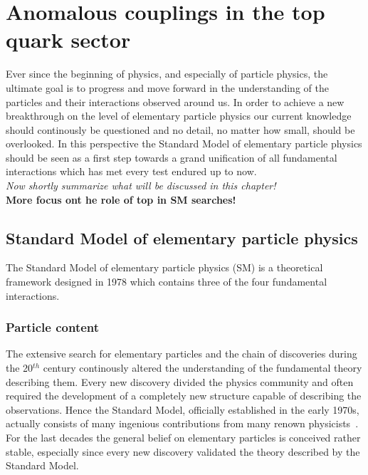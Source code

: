 \chapter{Anomalous couplings in the top quark sector} \label{chp::SM}

Ever since the beginning of physics, and especially of particle physics, the ultimate goal is to progress and move forward in the understanding of the particles and their interactions observed around us. 
In order to achieve a new breakthrough on the level of elementary particle physics our current knowledge should continously be questioned and no detail, no matter how small, should be overlooked.
In this perspective the Standard Model of elementary particle physics should be seen as a first step towards a grand unification of all fundamental interactions which has met every test endured up to now.
\\
\textit{Now shortly summarize what will be discussed in this chapter!}\\
\textbf{More focus ont he role of top in SM searches!}

\section{Standard Model of elementary particle physics}
The Standard Model of elementary particle physics (SM) is a theoretical framework designed in 1978 which contains three of the four fundamental interactions.

\subsection{Particle content}

The extensive search for elementary particles and the chain of discoveries during the 20$^{th}$ century continously altered the understanding of the fundamental theory describing them.
Every new discovery divided the physics community and often required the development of a completely new structure capable of describing the observations.
Hence the Standard Model, officially established in the early 1970s, actually consists of many ingenious contributions from many renown physicists~\cite{Griffiths}. 
For the last decades the general belief on elementary particles is conceived rather stable, especially since every new discovery validated the theory described by the Standard Model. %

